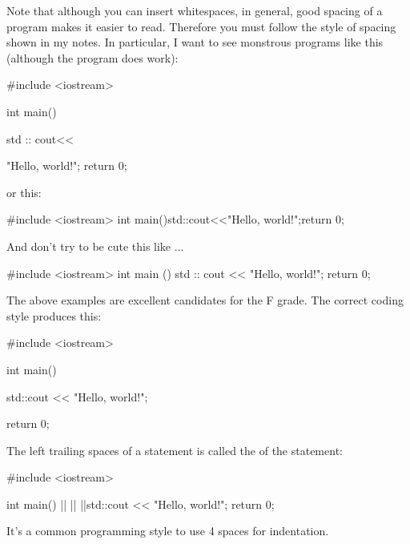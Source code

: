 Note that although you can insert whitespaces, 
in general, good spacing of a program makes it easier to read. 
Therefore you must follow the style of spacing shown in my notes. 
In particular, I 
 want to see monstrous programs like this 
(although the program does work):
\begin{console}
#include <iostream>

int                        main(){std
::
                    cout<<

"Hello, world!\n"; return 0; }
\end{console}
or this: 
\begin{console}
#include <iostream>
int main(){std::cout<<"Hello, world!\n";return 0;}
\end{console}
And don't try to be cute this like ...
\begin{console}
#include <iostream>
int
 main
  ()
   {
    std
     ::
      cout
       <<
        "Hello, world!\n"; 
         return 0; 
          }
\end{console}
The above examples are excellent candidates for the F grade. 
The correct coding style produces this:
\begin{console}
#include <iostream>

int main()
{
    std::cout << "Hello, world!\n";

    return 0;
}
\end{console}

The left trailing spaces of a statement is called the 
of the statement:
\begin{consolethree}[escapeinside=||]
#include <iostream>

int main()
{
||   ||   ||std::cout << "Hello, world!\n"; 
      return 0;
}
\end{consolethree}
%
It's a common programming style to use 4 spaces for indentation. 

